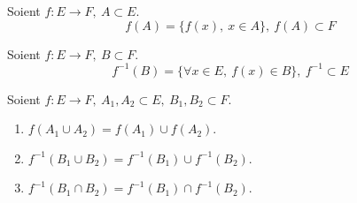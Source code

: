 \begin{definition}
    Soient $f : E \to F,\ A \subset E$.
	\[ f(A) = \{ f(x),\ x \in A \},\ f(A) \subset F \]
\end{definition}

\begin{definition}
	Soient $f : E \to F,\ B \subset F$.
	\[ f^{-1}(B) = \{ \forall x \in E,\ f(x) \in B \},\ f^{-1} \subset E \]
\end{definition}

\begin{proposition}
    Soient $f : E \to F,\ A_1, A_2 \subset E,\ B_1, B_2 \subset F$.
    \begin{enumerate}
        \item $f(A_1 \cup A_2) = f(A_1) \cup f(A_2)$.
        \item $f^{-1} (B_1 \cup B_2) = f^{-1} (B_1) \cup f^{-1} (B_2)$.
        \item $f^{-1} (B_1 \cap B_2) = f^{-1} (B_1) \cap f^{-1} (B_2)$.
    \end{enumerate}
\end{proposition} 